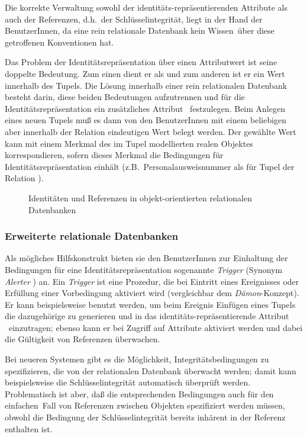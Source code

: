 %
\par{}Die korrekte Verwaltung sowohl der identit\"{a}ts-repr\"{a}sentierenden
Attribute als auch der Referenzen, d.h.\ der Schl\"{u}sselintegrit\"{a}t,
liegt in der Hand der BenutzerInnen, da eine rein relationale
Datenbank kein \rglq{}Wissen\rgrq\ \"{u}ber diese getroffenen Konventionen
hat.
%
\par{}Das Problem der Identit\"{a}tsrepr\"{a}sentation \"{u}ber einen
Attributwert ist seine doppelte Bedeutung. Zum einen dient er als
\objid\/ und zum anderen ist er ein Wert innerhalb des Tupels. Die
L\"{o}sung innerhalb einer rein relationalen Datenbank besteht darin,
diese beiden Bedeutungen aufzutrennen und f\"{u}r die
Identit\"{a}tsrepr\"{a}sentation ein zus\"{a}tzliches Attribut
\ festzulegen. Beim Anlegen eines neuen Tupels mu\ss{} es
dann von den BenutzerInnen mit einem beliebigen aber innerhalb der
Relation eindeutigen Wert belegt werden. Der gew\"{a}hlte Wert kann mit
einem Merkmal des im Tupel modellierten realen Objektes
korrespondieren, sofern dieses Merkmal die Bedingungen f\"{u}r
Identit\"{a}tsrepr\"{a}sentation einh\"{a}lt (z.B.\ Personalausweisnummer als
\objid\/ f\"{u}r Tupel der Relation ).
%
\begin{figure}[htbp]%
\ifbuch%
\centerline{}%
\else%
\centerline{}%
\fi%
\caption{Identit\"{a}ten und Referenzen in objekt-orientierten
relationalen Datenbanken}\label{fig:oordbref}%
\end{figure}%
%
\subsubsection{Erweiterte relationale Datenbanken}
%
Als m\"{o}gliches Hilfskonstrukt bieten sie den BenutzerInnen zur
Einhaltung der Bedingungen f\"{u}r eine Identit\"{a}tsrepr\"{a}sentation
sogenannte {\em Trigger\/} \cite[]{bib:on94}
\cite[]{bib:vaga89} (Synonym {\em Alerter\/}
\cite[]{bib:ni88}) an. Ein {\em Trigger\/} ist eine
Prozedur, die bei Eintritt eines Ereignisses oder Erf\"{u}llung einer
Vorbedingung aktiviert wird (vergleichbar dem
{\em D\"{a}mon\/}-Konzept). Er kann beispielsweise benutzt werden, um
beim Ereignis \rglq{}Einf\"{u}gen eines Tupels\rgrq{} die dazugeh\"{o}rige
\objid\/ zu generieren und in das identit\"{a}ts-repr\"{a}sentierende
Attribut \ einzutragen; ebenso kann er bei Zugriff auf
Attribute aktiviert werden und dabei die G\"{u}ltigkeit von Referenzen
\"{u}berwachen.
%
\par{}Bei neueren Systemen gibt es die M\"{o}glichkeit,
Integrit\"{a}tsbedingungen zu spezifizieren, die von der relationalen
Datenbank \"{u}berwacht werden; damit kann beispielsweise die
Schl\"{u}sselintegrit\"{a}t automatisch \"{u}berpr\"{u}ft werden. Problematisch
ist aber, da\ss{} die entsprechenden Bedingungen auch f\"{u}r den
\rglq{}einfachen\rgrq\ Fall von Referenzen zwischen Objekten
spezifiziert werden m\"{u}ssen, obwohl die Bedingung der
Schl\"{u}sselintegrit\"{a}t bereits inh\"{a}rent in der Referenz enthalten ist.
%
